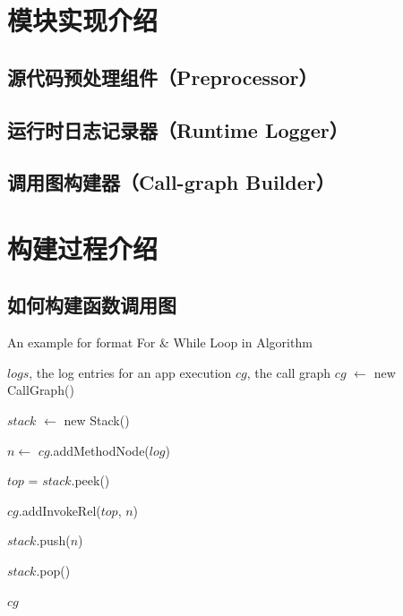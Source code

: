 \section{模块实现介绍}


\subsection{源代码预处理组件（Preprocessor）}

\subsection{运行时日志记录器（Runtime Logger）}

\subsection{调用图构建器（Call-graph Builder）}

\section{构建过程介绍}


\subsection{如何构建函数调用图}
\begin{algorithm}[h] 
	\caption{An example for format For \& While Loop in Algorithm} 

\begin{algorithmic}[1]
	\label{trans}
		
	 \small
	\REQUIRE  $logs$, the log entries for an app execution
	\ENSURE $cg$, the call graph
	\STATE 	$cg$ $\gets$ new CallGraph()
	
	

	
		\STATE 	$stack$ $\gets$ new Stack()
		
			
				\STATE 	$n \gets $ $cg$.addMethodNode($log$)
				
					\STATE 	$top$ = $stack$.peek()                 
						
					\STATE 	$cg$.addInvokeRel($top$, $n$) 
					
					\STATE 	$stack$.push($n$)
					
				\ELSE 
				
					\STATE 		$stack$.pop() 

				\ENDIF		
			\ENDIF

		\ENDFOR
	
	
	\ENDFOR
	
	\STATE $cg$
	

\end{algorithmic}
\end{algorithm}



